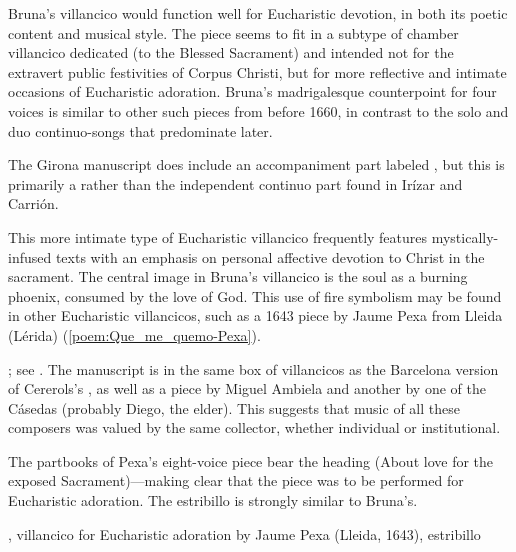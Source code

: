 Bruna's villancico would function well for Eucharistic devotion, in both its
poetic content and musical style.  
The piece seems to fit in a subtype of chamber villancico dedicated  (to the Blessed Sacrament) and intended not for the
extravert public festivities of Corpus Christi, but for more reflective and
intimate occasions of Eucharistic adoration.
Bruna's madrigalesque counterpoint for four voices is similar to other such
pieces from before 1660, in contrast to the solo and duo continuo-songs that
predominate later.%
\begin{Footnote}
    The Girona manuscript does include an accompaniment part labeled
    , but this is primarily a  rather
    than the independent continuo part found in Irízar and Carrión.
\end{Footnote}
This more intimate type of Eucharistic villancico frequently features
mystically-infused texts with an emphasis on personal affective devotion to
Christ in the sacrament.  
The central image in Bruna's villancico is the soul as a burning phoenix,
consumed by the love of God.
This use of fire symbolism may be found in other Eucharistic villancicos, such
as a 1643 piece by Jaume Pexa from Lleida (Lérida)
(\cref{poem:Que_me_quemo-Pexa}).%
\begin{Footnote}
    ; see .
    The manuscript is in the same box of villancicos as the Barcelona version of
    Cererols's , as well as a piece by Miguel Ambiela
    and another by one of the Cásedas (probably Diego, the elder).  
    This suggests that music of all these composers was valued by the same
    collector, whether individual or institutional.
\end{Footnote}
The partbooks of Pexa's eight-voice piece bear the heading  (About love for the exposed Sacrament)---making clear that
the piece was to be performed for Eucharistic adoration.  
The estribillo is strongly similar to Bruna's.

{, villancico for Eucharistic adoration by Jaume Pexa
(Lleida, 1643), estribillo}
\endinput

\subsection{%
Poetic and Musical Analysis
}

